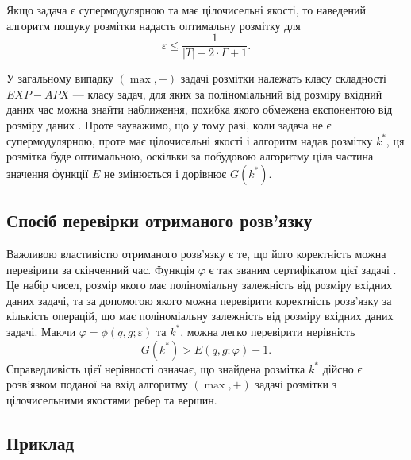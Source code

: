 Якщо задача є супермодулярною та має цілочисельні якості, то наведений алгоритм пошуку розмітки надасть
оптимальну розмітку для 
\begin{equation}
    \varepsilon \leq \frac{1}{|T|+2\cdot\Gamma+1}.
\end{equation}

У загальному випадку $(\max,+)$ задачі розмітки належать класу складності 
$EXP-APX$ --- класу задач, для яких за поліноміальний від розміру вхідний даних час 
можна знайти наближення, похибка якого обмежена експонентою від розміру даних \cite{li2016complexity}.
Проте зауважимо, що у тому разі, коли задача не є супермодулярною, проте має цілочисельні якості і алгоритм надав
розмітку $k^*$, ця розмітка буде оптимальною, оскільки за побудовою алгоритму ціла частина
значення функції $E$ не змінюється і дорівнює $G(k^*)$.

\subsection{Спосіб перевірки отриманого розв'язку}

Важливою властивістю отриманого розв’язку є те, що його коректність можна
перевірити за скінченний час. Функція $\varphi$ є так званим сертифікатом цієї задачі \cite{complexity}.
Це набір чисел, розмір якого має поліноміальну залежність від розміру вхідних даних
задачі, та за допомогою якого можна перевірити коректність розв’язку за кількість
операцій, що має поліноміальну залежність від розміру вхідних даних задачі. 
Маючи $\varphi=\phi(q,g;\varepsilon)$ та $k^*$, можна легко перевірити нерівність
\begin{equation}
    G(k^*)>E(q,g;\varphi)-1.
\end{equation}
Справедливість цієї нерівності означає, що знайдена розмітка $k^*$ дійсно є розв’язком
поданої на вхід алгоритму $(\max,+)$ задачі розмітки з цілочисельними якостями ребер та
вершин.

\subsection{Приклад}

